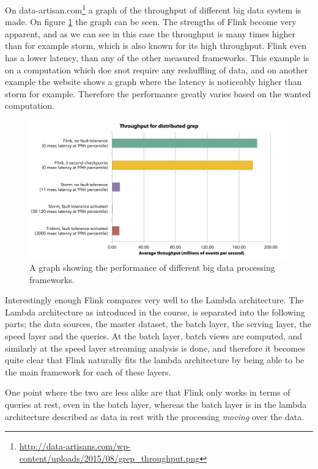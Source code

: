 On data-artisan.com\footnote{ \url{http://data-artisans.com/wp-content/uploads/2015/08/grep_throughput.png}} a graph of the throughput of different big data system is made. On figure \ref{fig:flink_bench} the graph can be seen. The strengths of Flink become very apparent, and as we can see in this case the throughput is many times higher than for example storm, which is also known for its high throughput. Flink even has a lower latency, than any of the other measured frameworks. This example is on a computation which doe snot require any reshuffling of data, and on another example the website shows a graph where the latency is noticeably higher than storm for example. Therefore the performance greatly varies based on the wanted computation.

\begin{figure}[H]
	\includegraphics[width=\linewidth]{figures/flink_throughput.png}
	\caption{A graph showing the performance of different big data processing frameworks.}
	\label{fig:flink_bench}
\end{figure}

\newpar Interestingly enough Flink compares very well to the Lambda architecture. The Lambda architecture as introduced in the course, is separated into the following parts; the data sources, the master dataset, the batch layer, the serving layer, the speed layer and the queries. At the batch layer, batch views are computed, and similarly at the speed layer streaming analysis is done, and therefore it becomes quite clear that Flink naturally fits the lambda architecture by being able to be the main framework for each of these layers.

One point where the two are less alike are that Flink only works in terms of queries at rest, even in the batch layer, whereas the batch layer is in the lambda architecture described as data in rest with the processing \textit{moving} over the data.

